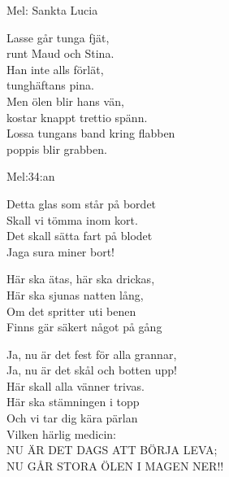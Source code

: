 \begin{SongText}
    \begin{SongInfo}
        Mel: Sankta Lucia
    \end{SongInfo}
    \begin{SongVerse}
        Lasse går tunga fjät,\\%
        runt Maud och Stina.\\%
        Han inte alls förlät,\\%
        tunghäftans pina.\\%
        Men ölen blir hans vän,\\%
        kostar knappt trettio spänn.\\%
        Lossa tungans band kring flabben\\%
        poppis blir grabben.
    \end{SongVerse}
\end{SongText}
\begin{SongText}
    \begin{SongInfo}
        Mel:34:an
    \end{SongInfo}
    \begin{SongVerse}
        Detta glas som står på bordet\\%
        Skall vi tömma inom kort.\\%
        Det skall sätta fart på blodet\\%
        Jaga sura miner bort!
    \end{SongVerse}
    \begin{SongVerse}
        Här ska ätas, här ska drickas,\\%
        Här ska sjunas natten lång,\\%
        Om det spritter uti benen\\%
        Finns gär säkert något på gång
    \end{SongVerse}
    \begin{SongVerse}
        Ja, nu är det fest för alla grannar,\\%
        Ja, nu är det skål och botten upp!\\%
        Här skall alla vänner trivas.\\%
        Här ska stämningen i topp\\%
        Och vi tar dig kära pärlan\\%
        Vilken härlig medicin:\\%
        NU ÄR DET DAGS ATT BÖRJA LEVA;\\%
        NU GÅR STORA ÖLEN I MAGEN NER!!
    \end{SongVerse}
\end{SongText}
